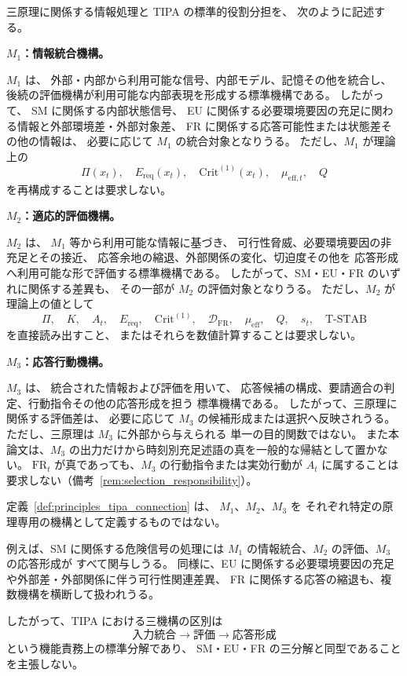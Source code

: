 \begin{definition}
\label{def:principles_tipa_connection}
三原理に関係する情報処理と
TIPA の標準的役割分担を、
次のように記述する。

\medskip
\noindent
\textbf{$M_1$：情報統合機構。}

$M_1$ は、
外部・内部から利用可能な信号、内部モデル、記憶その他を統合し、
後続の評価機構が利用可能な内部表現を形成する標準機構である。
したがって、
SM に関係する内部状態信号、
EU に関係する必要環境要因の充足に関わる情報と外部環境差・外部対象差、
FR に関係する応答可能性または状態差その他の情報は、
必要に応じて $M_1$ の統合対象となりうる。
ただし、$M_1$ が理論上の
\[
  \Pi(x_t),\quad
  E_{\mathrm{req}}(x_t),\quad
  \mathrm{Crit}^{(1)}(x_t),\quad
  \mu_{\mathrm{eff},t},\quad
  Q
\]
を再構成することは要求しない。

\medskip
\noindent
\textbf{$M_2$：適応的評価機構。}

$M_2$ は、
$M_1$ 等から利用可能な情報に基づき、
可行性脅威、必要環境要因の非充足とその接近、
応答余地の縮退、外部関係の変化、切迫度その他を
応答形成へ利用可能な形で評価する標準機構である。
したがって、SM・EU・FR のいずれに関係する差異も、
その一部が $M_2$ の評価対象となりうる。
ただし、$M_2$ が理論上の値として
\[
  \Pi,\quad
  K,\quad
  A_t,\quad
  E_{\mathrm{req}},\quad
  \mathrm{Crit}^{(1)},\quad
  \mathcal{D}_{\mathrm{FR}},\quad
  \mu_{\mathrm{eff}},\quad
  Q,\quad
  s_t,\quad
  \text{T-STAB}
\]
を直接読み出すこと、
またはそれらを数値計算することは要求しない。

\medskip
\noindent
\textbf{$M_3$：応答行動機構。}

$M_3$ は、
統合された情報および評価を用いて、
応答候補の構成、要請適合の判定、行動指令その他の応答形成を担う
標準機構である。
したがって、三原理に関係する評価差は、
必要に応じて $M_3$ の候補形成または選択へ反映されうる。
ただし、三原理は $M_3$ に外部から与えられる
単一の目的関数ではない。
また本論文は、$M_3$ の出力だけから時刻別充足述語の真を一般的な帰結として置かない。
$\mathrm{FR}_t$ が真であっても、$M_3$ の行動指令または実効行動が
$A_t$ に属することは要求しない（備考~\ref{rem:selection_responsibility}）。
\end{definition}

\begin{remark}[M1・M2・M3 は三原理専用機構ではない]
\label{rem:tipa_not_principle_modules}
定義~\ref{def:principles_tipa_connection} は、
$M_1$、$M_2$、$M_3$ を
それぞれ特定の原理専用の機構として定義するものではない。

例えば、SM に関係する危険信号の処理には
$M_1$ の情報統合、$M_2$ の評価、$M_3$ の応答形成が
すべて関与しうる。
同様に、EU に関係する必要環境要因の充足や外部差・外部関係に伴う可行性関連差異、
FR に関係する応答の縮退も、複数機構を横断して扱われうる。

したがって、TIPA における三機構の区別は
\[
  \text{入力統合}
  \rightarrow
  \text{評価}
  \rightarrow
  \text{応答形成}
\]
という機能責務上の標準分解であり、
SM・EU・FR の三分解と同型であることを主張しない。
\end{remark}

